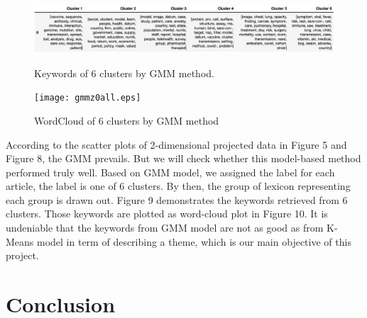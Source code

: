 \documentclass[12pt]{article}
\begin{document}
\begin{figure}[!t]
  \centering
  \begin{minipage}[b]{1\textwidth}
    \includegraphics[width=1\columnwidth]{gmm_keywords.eps}
    \caption{Keywords of 6 clusters by GMM method.}
  \end{minipage}
  \hfill
  \begin{minipage}[b]{0.7\textwidth}
    \texttt{[image: gmmz0all.eps]}
    \caption{WordCloud of 6 clusters by GMM method\label{nqa}}
  \end{minipage}
\end{figure}

According to the scatter plots of 2-dimensional projected data in Figure 5 and Figure 8, the GMM prevails. But we will check whether this model-based method performed truly well. Based on GMM model, we assigned the label for each article, the label is one of 6 clusters. By then, the group of lexicon representing each group is drawn out. Figure 9 demonstrates the keywords retrieved from 6 clusters. Those keywords are plotted as word-cloud plot in Figure 10. It is undeniable that the keywords from GMM model are not as good as from K-Means model in term of describing a theme, which is our main objective of this project. 




\section{Conclusion}
\end{document}
